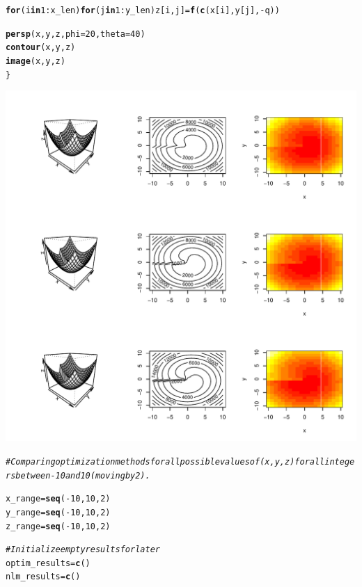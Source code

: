 \documentclass{article}\usepackage[]{graphicx}\usepackage[]{color}
\makeatletter
\def\maxwidth{ %
  \ifdim\Gin@nat@width>\linewidth
    \linewidth
  \else
    \Gin@nat@width
  \fi
}
\newcommand{\hlnum}[1]{\textcolor[rgb]{0.686,0.059,0.569}{#1}}%
\newcommand{\hlcom}[1]{\textcolor[rgb]{0.678,0.584,0.686}{\textit{#1}}}%
\newcommand{\hlopt}[1]{\textcolor[rgb]{0,0,0}{#1}}%
\newcommand{\hlstd}[1]{\textcolor[rgb]{0.345,0.345,0.345}{#1}}%
\newcommand{\hlkwa}[1]{\textcolor[rgb]{0.161,0.373,0.58}{\textbf{#1}}}%
\newcommand{\hlkwb}[1]{\textcolor[rgb]{0.69,0.353,0.396}{#1}}%
\newcommand{\hlkwc}[1]{\textcolor[rgb]{0.333,0.667,0.333}{#1}}%
\newcommand{\hlkwd}[1]{\textcolor[rgb]{0.737,0.353,0.396}{\textbf{#1}}}%
\newenvironment{kframe}{%
 \def\at@end@of@kframe{}%
 \ifinner\ifhmode%
  \def\at@end@of@kframe{\end{minipage}}%
  \begin{minipage}{\columnwidth}%
 \fi\fi%
 \def\FrameCommand##1{\hskip\@totalleftmargin \hskip-\fboxsep
 \colorbox{shadecolor}{##1}\hskip-\fboxsep
     \hskip-\linewidth \hskip-\@totalleftmargin \hskip\columnwidth}%
 \MakeFramed {\advance\hsize-\width
   \@totalleftmargin\z@ \linewidth\hsize
   \@setminipage}}%
 {\par\unskip\endMakeFramed%
 \at@end@of@kframe}
\newenvironment{knitrout}{}{} %
\makeatother
\begin{document}
\begin{knitrout}
\begin{kframe}
\begin{alltt}
    \hlkwa{for} \hlstd{(i} \hlkwa{in} \hlnum{1}\hlopt{:}\hlstd{x_len)} \hlkwa{for} \hlstd{(j} \hlkwa{in} \hlnum{1}\hlopt{:}\hlstd{y_len) z[i,j]} \hlkwb{=} \hlkwd{f}\hlstd{(}\hlkwd{c}\hlstd{(x[i],y[j],}\hlopt{-}\hlstd{q))}

    \hlkwd{persp}\hlstd{(x, y, z,} \hlkwc{phi} \hlstd{=} \hlnum{20}\hlstd{,} \hlkwc{theta} \hlstd{=} \hlnum{40}\hlstd{)}
    \hlkwd{contour}\hlstd{(x, y, z)}
    \hlkwd{image}\hlstd{(x, y, z)}
\hlstd{\}}
\end{alltt}
\end{kframe}
\includegraphics[width=\maxwidth]{figure/unnamed-chunk-6-1} 
\begin{kframe}\begin{alltt}
\hlcom{# Comparing optimization methods for all possible values of (x, y, z) for all integers between -10 and 10 (moving by 2).}

\hlstd{x_range} \hlkwb{=} \hlkwd{seq}\hlstd{(}\hlopt{-}\hlnum{10}\hlstd{,}\hlnum{10}\hlstd{,}\hlnum{2}\hlstd{)}
\hlstd{y_range} \hlkwb{=} \hlkwd{seq}\hlstd{(}\hlopt{-}\hlnum{10}\hlstd{,}\hlnum{10}\hlstd{,}\hlnum{2}\hlstd{)}
\hlstd{z_range} \hlkwb{=} \hlkwd{seq}\hlstd{(}\hlopt{-}\hlnum{10}\hlstd{,}\hlnum{10}\hlstd{,}\hlnum{2}\hlstd{)}

\hlcom{# Initialize empty results for later}
\hlstd{optim_results} \hlkwb{=} \hlkwd{c}\hlstd{()}
\hlstd{nlm_results} \hlkwb{=} \hlkwd{c}\hlstd{()}


\end{alltt}
\end{kframe}
\end{knitrout}
\end{document}

